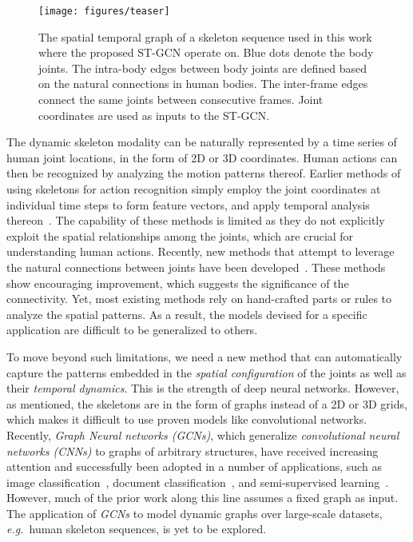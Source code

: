 \documentclass[letterpaper]{article} \usepackage{aaai18}  \usepackage{times}  \usepackage{helvet}  \usepackage{courier}  \usepackage{url}  \usepackage{graphicx}
\begin{document}
\begin{figure}
\centering
\texttt{[image: figures/teaser]}
\caption{\small
	The spatial temporal graph of a skeleton sequence used
	in this work where the proposed ST-GCN operate on.
	Blue dots denote the body joints.
	The intra-body edges between body joints are defined
	based on the natural connections in human bodies.
	The inter-frame edges connect the same joints between consecutive frames.
	Joint coordinates are used as inputs to the ST-GCN.}
\label{fig:teaser_intro}
\end{figure}

The dynamic skeleton modality can be naturally represented
by a time series of human joint locations, in the form of
2D or 3D coordinates. Human actions can then be recognized
by analyzing the motion patterns thereof.
Earlier methods of using skeletons for action recognition
simply employ the joint coordinates at individual time steps
to form feature vectors, and apply temporal analysis thereon~\cite{Wang2012CVPR,Fernando2015VideoDarwin}.
The capability of these methods is limited as they do not explicitly
exploit the spatial relationships among the joints, which are crucial
for understanding human actions.
Recently, new methods that attempt to leverage the natural connections between
joints have been developed~\cite{Shahroudy2016CVPR,Du2015CVPR}. These methods show encouraging
improvement, which suggests the significance of the connectivity.
Yet, most existing methods rely on hand-crafted parts or rules to
analyze the spatial patterns. As a result, the models devised for
a specific application are difficult to be generalized to others.

To move beyond such limitations, we need a new method that can
automatically capture the patterns embedded in the
\emph{spatial configuration} of the joints as well as their
\emph{temporal dynamics}. This is the strength of deep neural networks.
However, as mentioned, the skeletons are in the form of graphs
instead of a 2D or 3D grids, which makes it difficult to use proven
models like convolutional networks.
Recently, \emph{Graph Neural networks (GCNs)}, which generalize
\emph{convolutional neural networks (CNNs)} to graphs of arbitrary structures,
have received increasing attention and successfully been adopted in
a number of applications, such as
image classification~\cite{Bruna2014ICLR},
document classification~\cite{Defferrard2016NIPS},
and semi-supervised learning~\cite{Kipf2017ICLR}.
However, much of the prior work along this line assumes a fixed graph
as input. The application of \emph{GCNs} to model dynamic graphs
over large-scale datasets, \textit{e.g.}~human skeleton sequences, is
yet to be explored.
\end{document}
